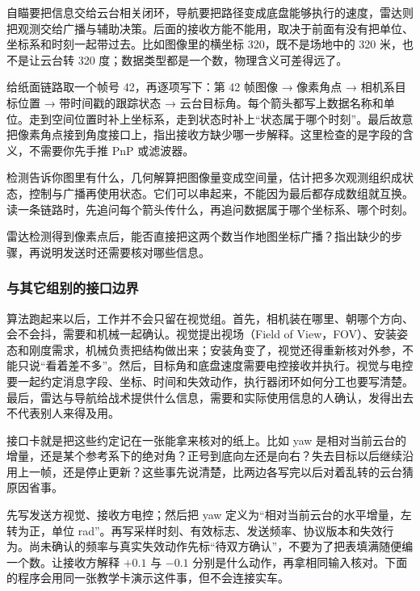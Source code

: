自瞄要把信息交给云台相关闭环，导航要把路径变成底盘能够执行的速度，雷达则把观测交给广播与辅助决策。后面的接收方能不能用，取决于前面有没有把单位、坐标系和时刻一起带过去。比如图像里的横坐标 320，既不是场地中的 320 米，也不是让云台转 320 度；数据类型都是一个数，物理含义可差得远了。

\begin{example}[追踪一条观测]
给纸面链路取一个帧号 42，再逐项写下：第 42 帧图像 → 像素角点 → 相机系目标位置 → 带时间戳的跟踪状态 → 云台目标角。每个箭头都写上数据名称和单位。走到空间位置时补上坐标系，走到状态时补上“状态属于哪个时刻”。最后故意把像素角点接到角度接口上，指出接收方缺少哪一步解释。这里检查的是字段的含义，不需要你先手推 PnP 或滤波器。
\end{example}

\begin{conclusion}
检测告诉你图里有什么，几何解算把图像量变成空间量，估计把多次观测组织成状态，控制与广播再使用状态。它们可以串起来，不能因为最后都存成数组就互换。读一条链路时，先追问每个箭头传什么，再追问数据属于哪个坐标系、哪个时刻。
\end{conclusion}

\begin{exercise}
\label{v3-ex-overview-3}
雷达检测得到像素点后，能否直接把这两个数当作地图坐标广播？指出缺少的步骤，再说明发送时还需要核对哪些信息。
\end{exercise}

\subsubsection{与其它组别的接口边界}

算法跑起来以后，工作并不会只留在视觉组。首先，相机装在哪里、朝哪个方向、会不会抖，需要和机械一起确认。视觉提出视场（Field of View，FOV）、安装姿态和刚度需求，机械负责把结构做出来；安装角变了，视觉还得重新核对外参，不能只说“看着差不多”。然后，目标角和底盘速度需要电控接收并执行。视觉与电控要一起约定消息字段、坐标、时间和失效动作，执行器闭环如何分工也要写清楚。最后，雷达与导航给战术提供什么信息，需要和实际使用信息的人确认，发得出去不代表别人来得及用。

接口卡就是把这些约定记在一张能拿来核对的纸上。比如 yaw 是相对当前云台的增量，还是某个参考系下的绝对角？正号到底向左还是向右？失去目标以后继续沿用上一帧，还是停止更新？这些事先说清楚，比两边各写完以后对着乱转的云台猜原因省事。

\begin{example}[一张最小接口卡]
先写发送方视觉、接收方电控；然后把 yaw 定义为“相对当前云台的水平增量，左转为正，单位 rad”。再写采样时刻、有效标志、发送频率、协议版本和失效行为。尚未确认的频率与真实失效动作先标“待双方确认”，不要为了把表填满随便编一个数。让接收方解释 $+0.1$ 与 $-0.1$ 分别是什么动作，再拿相同输入核对。下面的程序会用同一张教学卡演示这件事，但不会连接实车。
\end{example}

